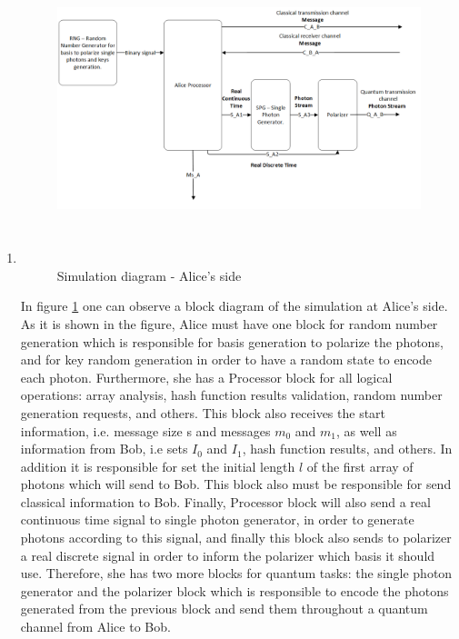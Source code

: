 \begin{enumerate}
  \item

  \begin{figure}[h]
	\centering
	\includegraphics[width=1.1\textwidth, height=9cm]{./sdf/ot_with_discrete_variables/figures/Simulation_Alice.png}
	\caption{Simulation diagram - Alice's side}\label{simulationalice}
\end{figure}

    In figure \ref{simulationalice} one can observe a block diagram of the simulation at Alice's side. As it is shown in the figure, Alice must have one block for random number generation which is responsible for basis generation to polarize the photons, and for key random generation in order to have a random state to encode each photon. Furthermore, she has a Processor block for all logical operations: array analysis, hash function results validation, random number generation requests, and others. This block also receives the start information, i.e. message size s and messages $m_{0}$ and $m_{1}$, as well as information from Bob, i.e sets $I_{0}$ and $I_{1}$, hash function results, and others. In addition it is responsible for set the initial length $l$ of the first array of photons which will send to Bob. This block also must be responsible for send classical information to Bob. Finally, Processor block will also send a real continuous time signal to single photon generator, in order to generate photons according to this signal, and finally this block also sends to polarizer a real discrete signal in order to inform the polarizer which basis it should use. Therefore, she has two more blocks for quantum tasks: the single photon generator and the polarizer block which is responsible to encode the photons generated from the previous block and send them throughout a quantum channel from Alice to Bob.


\end{enumerate}
